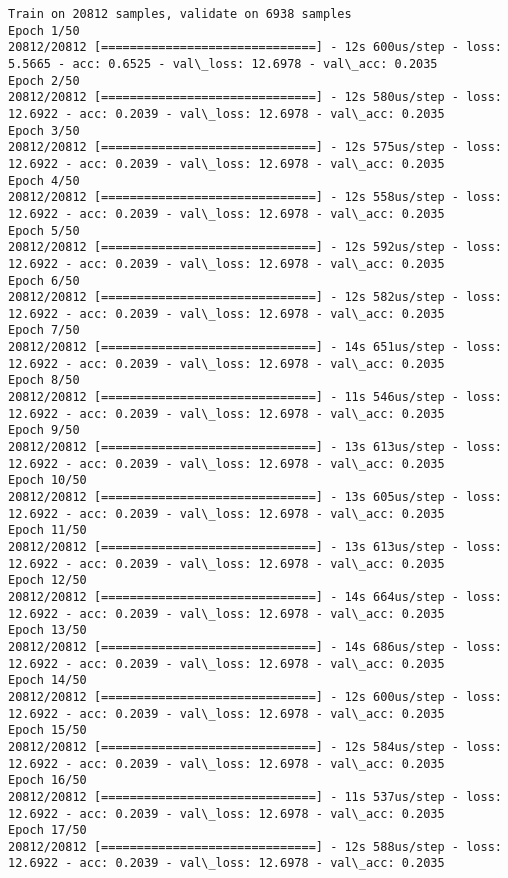 \documentclass[11pt]{article}
\begin{document}
    \begin{Verbatim}[commandchars=\\\{\}]
Train on 20812 samples, validate on 6938 samples
Epoch 1/50
20812/20812 [==============================] - 12s 600us/step - loss: 5.5665 - acc: 0.6525 - val\_loss: 12.6978 - val\_acc: 0.2035
Epoch 2/50
20812/20812 [==============================] - 12s 580us/step - loss: 12.6922 - acc: 0.2039 - val\_loss: 12.6978 - val\_acc: 0.2035
Epoch 3/50
20812/20812 [==============================] - 12s 575us/step - loss: 12.6922 - acc: 0.2039 - val\_loss: 12.6978 - val\_acc: 0.2035
Epoch 4/50
20812/20812 [==============================] - 12s 558us/step - loss: 12.6922 - acc: 0.2039 - val\_loss: 12.6978 - val\_acc: 0.2035
Epoch 5/50
20812/20812 [==============================] - 12s 592us/step - loss: 12.6922 - acc: 0.2039 - val\_loss: 12.6978 - val\_acc: 0.2035
Epoch 6/50
20812/20812 [==============================] - 12s 582us/step - loss: 12.6922 - acc: 0.2039 - val\_loss: 12.6978 - val\_acc: 0.2035
Epoch 7/50
20812/20812 [==============================] - 14s 651us/step - loss: 12.6922 - acc: 0.2039 - val\_loss: 12.6978 - val\_acc: 0.2035
Epoch 8/50
20812/20812 [==============================] - 11s 546us/step - loss: 12.6922 - acc: 0.2039 - val\_loss: 12.6978 - val\_acc: 0.2035
Epoch 9/50
20812/20812 [==============================] - 13s 613us/step - loss: 12.6922 - acc: 0.2039 - val\_loss: 12.6978 - val\_acc: 0.2035
Epoch 10/50
20812/20812 [==============================] - 13s 605us/step - loss: 12.6922 - acc: 0.2039 - val\_loss: 12.6978 - val\_acc: 0.2035
Epoch 11/50
20812/20812 [==============================] - 13s 613us/step - loss: 12.6922 - acc: 0.2039 - val\_loss: 12.6978 - val\_acc: 0.2035
Epoch 12/50
20812/20812 [==============================] - 14s 664us/step - loss: 12.6922 - acc: 0.2039 - val\_loss: 12.6978 - val\_acc: 0.2035
Epoch 13/50
20812/20812 [==============================] - 14s 686us/step - loss: 12.6922 - acc: 0.2039 - val\_loss: 12.6978 - val\_acc: 0.2035
Epoch 14/50
20812/20812 [==============================] - 12s 600us/step - loss: 12.6922 - acc: 0.2039 - val\_loss: 12.6978 - val\_acc: 0.2035
Epoch 15/50
20812/20812 [==============================] - 12s 584us/step - loss: 12.6922 - acc: 0.2039 - val\_loss: 12.6978 - val\_acc: 0.2035
Epoch 16/50
20812/20812 [==============================] - 11s 537us/step - loss: 12.6922 - acc: 0.2039 - val\_loss: 12.6978 - val\_acc: 0.2035
Epoch 17/50
20812/20812 [==============================] - 12s 588us/step - loss: 12.6922 - acc: 0.2039 - val\_loss: 12.6978 - val\_acc: 0.2035

\end{Verbatim}
\end{document}

